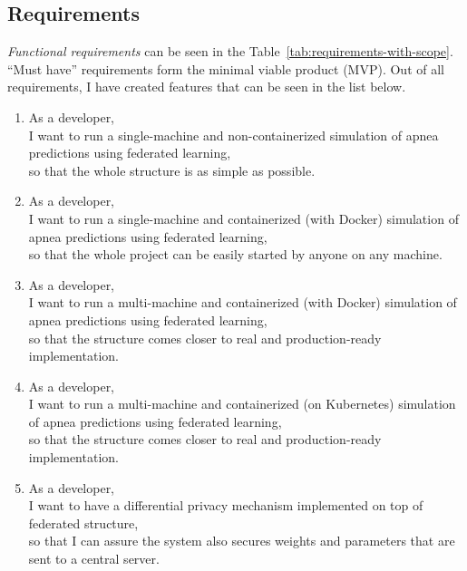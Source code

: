 \subsection{Requirements}

\emph{Functional requirements} can be seen in the Table~\ref{tab:requirements-with-scope}. ``Must have'' requirements form the minimal viable product (MVP). Out of all requirements, I have created features that can be seen in the list below.

\begin{enumerate}
    \item As a developer, \\
    I want to run a single-machine and non-containerized simulation of apnea predictions using federated learning, \\
    so that the whole structure is as simple as possible.
    \item As a developer, \\
    I want to run a single-machine and containerized (with Docker) simulation of apnea predictions using federated learning, \\
    so that the whole project can be easily started by anyone on any machine.
    \item As a developer, \\
    I want to run a multi-machine and containerized (with Docker) simulation of apnea predictions using federated learning, \\
    so that the structure comes closer to real and production-ready implementation.
    \item As a developer, \\
    I want to run a multi-machine and containerized (on Kubernetes) simulation of apnea predictions using federated learning, \\
    so that the structure comes closer to real and production-ready implementation.
    \item As a developer, \\
    I want to have a differential privacy mechanism implemented on top of federated structure, \\
    so that I can assure the system also secures weights and parameters that are sent to a central server.
\end{enumerate}

